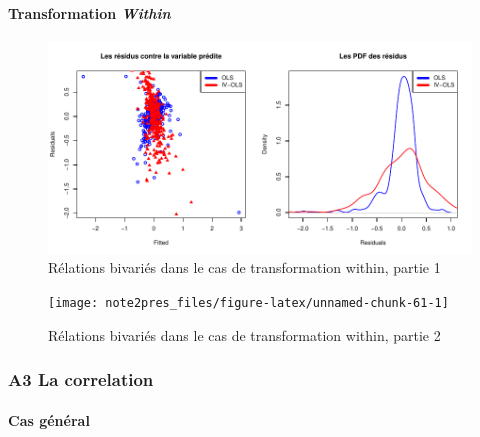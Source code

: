 \documentclass[11pt,]{article}
\let\oldparagraph\paragraph
\renewcommand{\paragraph}[1]{\oldparagraph{#1}\mbox{}}
\begin{document}
\FloatBarrier

\hypertarget{transformation-within}{%
\paragraph{\texorpdfstring{Transformation
\emph{Within}}{Transformation Within}}\label{transformation-within}}

\FloatBarrier

\begin{figure}[!htbp]

{\centering \includegraphics{note2pres_files/figure-latex/unnamed-chunk-60-1} 

}

\caption{Rélations bivariés dans le cas de transformation within, partie 1}\label{fig:unnamed-chunk-60}
\end{figure}

\FloatBarrier

\begin{figure}[!htbp]

{\centering \texttt{[image: note2pres\_files/figure-latex/unnamed-chunk-61-1]} 

}

\caption{Rélations bivariés dans le cas de transformation within, partie 2}\label{fig:unnamed-chunk-61}
\end{figure}

\FloatBarrier

\newpage

\hypertarget{a3-la-correlation}{%
\subsubsection{A3 La correlation}\label{a3-la-correlation}}

\hypertarget{cas-general-1}{%
\paragraph{Cas général}\label{cas-general-1}}
\end{document}

